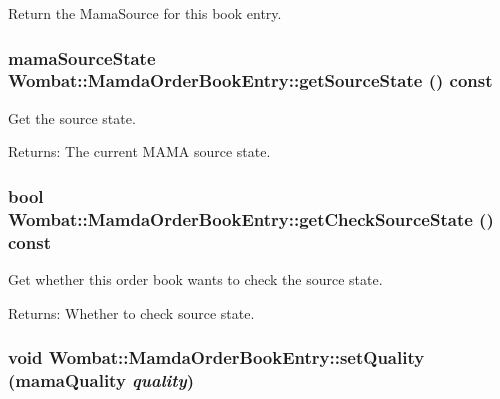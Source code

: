 Return the Mama\-Source for this book entry. 

\hypertarget{classWombat_1_1MamdaOrderBookEntry_e119e549d0645a5d67d1d2ee465c0f46}{
\subsubsection[getSourceState]{\setlength{\rightskip}{0pt plus 5cm}mama\-Source\-State Wombat::Mamda\-Order\-Book\-Entry::get\-Source\-State () const}}
\label{classWombat_1_1MamdaOrderBookEntry_e119e549d0645a5d67d1d2ee465c0f46}


Get the source state. 

\begin{Desc}
\item[Returns:]The current MAMA source state. \end{Desc}
\hypertarget{classWombat_1_1MamdaOrderBookEntry_60be50a62ad2b949f2ddf9d0a7d842fd}{
\subsubsection[getCheckSourceState]{\setlength{\rightskip}{0pt plus 5cm}bool Wombat::Mamda\-Order\-Book\-Entry::get\-Check\-Source\-State () const}}
\label{classWombat_1_1MamdaOrderBookEntry_60be50a62ad2b949f2ddf9d0a7d842fd}


Get whether this order book wants to check the source state. 

\begin{Desc}
\item[Returns:]Whether to check source state. \end{Desc}
\hypertarget{classWombat_1_1MamdaOrderBookEntry_d478ee4fa730c31a1e9fec604d60f357}{
\subsubsection[setQuality]{\setlength{\rightskip}{0pt plus 5cm}void Wombat::Mamda\-Order\-Book\-Entry::set\-Quality (mama\-Quality {\em quality})}}
\label{classWombat_1_1MamdaOrderBookEntry_d478ee4fa730c31a1e9fec604d60f357}


